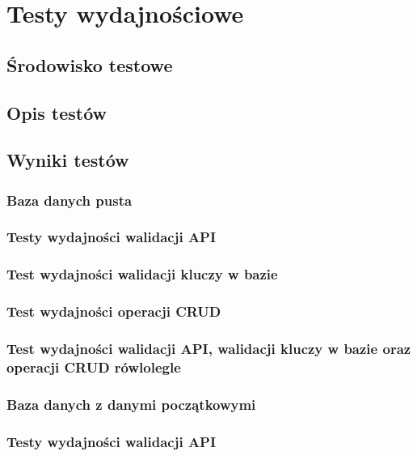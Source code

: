 \chapter{Testy wydajnościowe}
\section{Środowisko testowe}
\section{Opis testów}
\section{Wyniki testów}

\subsection{Baza danych pusta}
\subsection{Testy wydajności walidacji API}


\subsection{Test wydajności walidacji kluczy w bazie}


\subsection{Test wydajności operacji CRUD}


\subsection{Test wydajności walidacji API, walidacji kluczy w bazie oraz operacji CRUD rówlolegle }


\subsection{Baza danych z danymi początkowymi}
\subsection{Testy wydajności walidacji API}
%  

